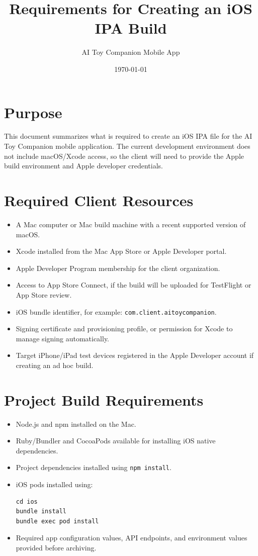 \documentclass[11pt]{article}
\title{Requirements for Creating an iOS IPA Build}
\author{AI Toy Companion Mobile App}
\date{\today}
\begin{document}
\maketitle

\section*{Purpose}

This document summarizes what is required to create an iOS IPA file for the AI Toy Companion mobile application. The current development environment does not include macOS/Xcode access, so the client will need to provide the Apple build environment and Apple developer credentials.

\section*{Required Client Resources}

\begin{itemize}[leftmargin=*]
  \item A Mac computer or Mac build machine with a recent supported version of macOS.
  \item Xcode installed from the Mac App Store or Apple Developer portal.
  \item Apple Developer Program membership for the client organization.
  \item Access to App Store Connect, if the build will be uploaded for TestFlight or App Store review.
  \item iOS bundle identifier, for example: \texttt{com.client.aitoycompanion}.
  \item Signing certificate and provisioning profile, or permission for Xcode to manage signing automatically.
  \item Target iPhone/iPad test devices registered in the Apple Developer account if creating an ad hoc build.
\end{itemize}

\section*{Project Build Requirements}

\begin{itemize}[leftmargin=*]
  \item Node.js and npm installed on the Mac.
  \item Ruby/Bundler and CocoaPods available for installing iOS native dependencies.
  \item Project dependencies installed using \texttt{npm install}.
  \item iOS pods installed using:
  \begin{verbatim}
cd ios
bundle install
bundle exec pod install
  \end{verbatim}
  \item Required app configuration values, API endpoints, and environment values provided before archiving.
\end{itemize}
\end{document}
